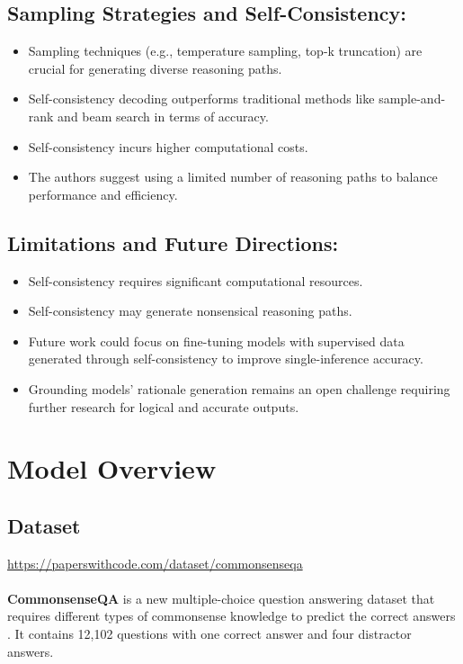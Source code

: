 \documentclass[24pt]{article}
\begin{document}
\subsection{Sampling Strategies and Self-Consistency:}
    \begin{itemize}
        \item Sampling techniques (e.g., temperature sampling, top-k truncation) are crucial for generating diverse reasoning paths.
        \item Self-consistency decoding outperforms traditional methods like sample-and-rank and beam search in terms of accuracy.
        \item Self-consistency incurs higher computational costs.
        \item The authors suggest using a limited number of reasoning paths to balance performance and efficiency.
    \end{itemize}
\subsection{Limitations and Future Directions:}
    \begin{itemize}
        \item Self-consistency requires significant computational resources.
        \item Self-consistency may generate nonsensical reasoning paths.
        \item Future work could focus on fine-tuning models with supervised data generated through self-consistency to improve single-inference accuracy.
        \item Grounding models' rationale generation remains an open challenge requiring further research for logical and accurate outputs.
    \end{itemize}




\section{Model Overview}
\subsection{Dataset}
\url{https://paperswithcode.com/dataset/commonsenseqa}\\ \\
\textbf{CommonsenseQA} is a new multiple-choice question answering dataset that requires different types of commonsense knowledge to predict the correct answers . It contains 12,102 questions with one correct answer and four distractor answers.
\end{document}
